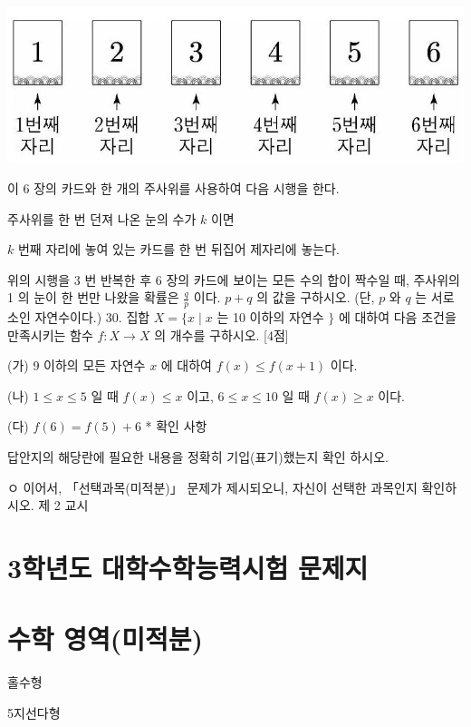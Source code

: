 \documentclass[10pt]{article}
\begin{document}
\begin{center}
\includegraphics[max width=\textwidth]{2023_05_20_665dd8a057732da498f1g-12}
\end{center}

이 6 장의 카드와 한 개의 주사위를 사용하여 다음 시행을 한다.

주사위를 한 번 던져 나온 눈의 수가 $k$ 이면

$k$ 번째 자리에 놓여 있는 카드를 한 번 뒤집어 제자리에 놓는다.

위의 시행을 3 번 반복한 후 6 장의 카드에 보이는 모든 수의 합이 짝수일 때, 주사위의 1 의 눈이 한 번만 나왔을 확률은 $\frac{q}{p}$ 이다. $p+q$ 의 값을 구하시오. (단, $p$ 와 $q$ 는 서로소인 자연수이다.) 30. 집합 $X=\{x \mid x$ 는 10 이하의 자연수 $\}$ 에 대하여 다음 조건을 만족시키는 함수 $f: X \rightarrow X$ 의 개수를 구하시오. [4점]

(가) 9 이하의 모든 자연수 $x$ 에 대하여 $f(x) \leq f(x+1)$ 이다.

(나) $1 \leq x \leq 5$ 일 때 $f(x) \leq x$ 이고, $6 \leq x \leq 10$ 일 때 $f(x) \geq x$ 이다.

(다) $f(6)=f(5)+6$ * 확인 사항

답안지의 해당란에 필요한 내용을 정확히 기입(표기)했는지 확인 하시오.

ㅇ 이어서, 「선택과목(미적분)」 문제가 제시되오니, 자신이 선택한 과목인지 확인하시오. 제 2 교시

\section{3학년도 대학수학능력시험 문제지}
\section{수학 영역(미적분)}
홀수형

5지선다형
\end{document}
